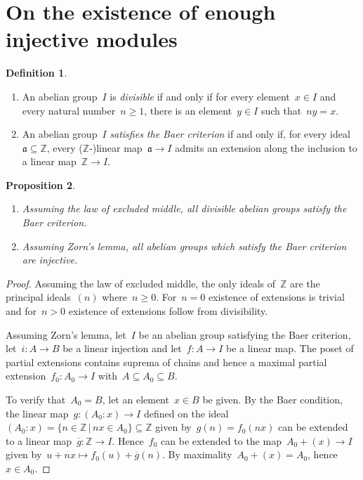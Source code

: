 \documentclass[oneside]{amsart}
\theoremstyle{definition}
\newtheorem{defn}{Definition}[section]
\theoremstyle{plain}
\newtheorem{prop}[defn]{Proposition}
\theoremstyle{remark}
\newcommand{\aaa}{\mathfrak{a}}
\newcommand{\ZZ}{\mathbb{Z}}
\renewcommand{\_}{\mathpunct{.}\,}
\begin{document}
\printbibliography
\enlargethispage{1em}

\appendix

\section{On the existence of enough injective modules}
\label{sect:enough-injective-modules}

\begin{defn}\begin{enumerate}
\item An abelian group~$I$ is \emph{divisible} if and only if for every
element~$x \in I$ and every natural number~$n \geq 1$, there is an element~$y \in I$
such that~$ny = x$.
\item An abelian group~$I$ \emph{satisfies the Baer criterion} if and only if,
for every ideal~$\aaa \subseteq \ZZ$, every ($\ZZ$-)linear map~$\aaa \to I$
admits an extension along the inclusion to a linear map~$\ZZ \to I$.
\end{enumerate}
\end{defn}

\begin{prop}
\label{prop:embed1}
\begin{enumerate}
\item Assuming the law of excluded middle, all divisible abelian groups satisfy
the Baer criterion.
\item Assuming Zorn's lemma, all abelian groups which satisfy the Baer criterion
are injective.
\end{enumerate}
\end{prop}

\begin{proof}Assuming the law of excluded middle, the only ideals of~$\ZZ$ are
the principal ideals~$(n)$ where~$n \geq 0$. For~$n = 0$ existence of
extensions is trivial and for~$n > 0$ existence of extensions follow from
divisibility.

Assuming Zorn's lemma, let~$I$ be an abelian group satisfying the Baer
criterion, let~$i : A \to B$ be a linear injection and let~$f : A \to I$ be a
linear map. The poset of partial extensions contains suprema of chains and
hence a maximal partial extension~$f_0 : A_0 \to I$ with~$A \subseteq A_0
\subseteq B$.

To verify that~$A_0 = B$, let an element~$x \in B$ be given.
By the Baer condition, the linear map~$g : (A_0 : x) \to I$ defined on the
ideal~$(A_0 : x) = \{ n \in \ZZ \,|\, nx \in A_0 \} \subseteq \ZZ$ given by~$g(n) =
f_0(nx)$ can be extended to a linear map~$\overline{g} : \ZZ \to I$.
Hence~$f_0$ can be extended to the map~$A_0 + (x) \to I$ given by~$u + nx
\mapsto f_0(u) + \overline{g}(n)$. By maximality~$A_0 + (x) = A_0$, hence~$x \in A_0$.
\end{proof}
\end{document}
